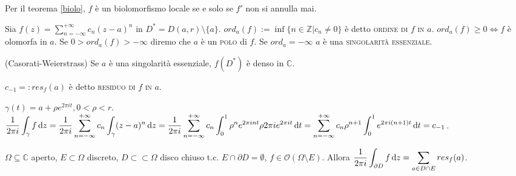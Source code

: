 Per il teorema \ref{biolo}, $f$ è un biolomorfismo locale se e solo se $f'$ non si annulla mai.

\begin{defn}
  Sia $\displaystyle f(z)=\sum_{n=-\infty}^{+\infty} c_n(z-a)^n$ in $D^*=D(a, r) \setminus \{a\}$. $ord_a(f):=\inf\{n \in \mathbb{Z} | c_n \not=0\}$ è detto \textsc{ordine di $f$ in $a$}. $ord_a(f) \ge 0 \Leftrightarrow f$ è olomorfa in $a$.
  Se $0>ord_a(f)>-\infty$ diremo che $a$ è un \textsc{polo} di $f$. Se $ord_a=-\infty$ $a$ è una \textsc{singolarità essenziale}.
\end{defn}

\begin{thm}
  (Casorati-Weierstrass) Se $a$ è una singolarità essenziale, $f(D^*)$ è denso in $\mathbb{C}$.
\end{thm}

\begin{defn}
  $c_{-1}=:res_f(a)$ è detto \textsc{residuo di $f$ in $a$}.
\end{defn}

$\gamma(t)=a+\rho e^{2\pi i t}, 0<\rho<r$.
$\displaystyle \frac{1}{2\pi i} \int_{\gamma} f \mathop{}\!\mathrm{d} z=\frac{1}{2\pi i} \sum_{n=-\infty}^{+\infty} c_n \int_{\gamma} (z-a)^n \mathop{}\!\mathrm{d} z=\frac{1}{2\pi i} \sum_{n=-\infty}^{+\infty} c_n \int_0^1 \rho^ne^{2\pi i n t} \rho 2 \pi i e^{2\pi i t} \mathop{}\!\mathrm{d} t=\sum_{n=-\infty}^{+\infty} c_n \rho^{n+1} \int_0^1 e^{2\pi i (n+1)t} \mathop{}\!\mathrm{d} t=c_{-1}$.

\begin{prop}
  $\Omega \subseteq \mathbb{C}$ aperto, $E \subset \Omega$ discreto, $D \subset \subset \Omega$ disco chiuso t.c. $E \cap \partial D=\emptyset$, $f\in \mathcal{O}(\Omega \setminus E)$.
  Allora $\displaystyle \frac{1}{2\pi i}\int_{\partial D} f \mathop{}\!\mathrm{d} z=\sum_{a \in D \cap E} res_f(a)$.
\end{prop}
